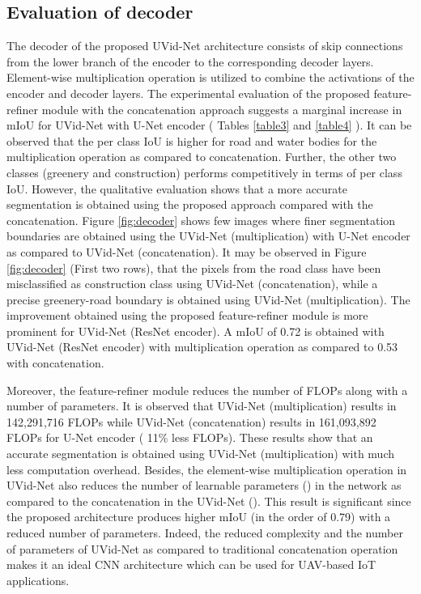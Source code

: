 \documentclass[journal]{IEEEtran}
\begin{document}
\subsection{Evaluation of decoder}
\label{Sec:Decoder}
The decoder of the proposed UVid-Net architecture consists of skip connections from the lower branch of the encoder to the corresponding decoder layers. Element-wise multiplication operation is utilized to combine the activations of the encoder and decoder layers. The experimental evaluation of the proposed feature-refiner module with the concatenation approach suggests a marginal increase in mIoU for UVid-Net with U-Net encoder ( Tables \ref{table3} and \ref{table4} ).  It can be observed that the per class IoU is higher for road and water bodies for the multiplication operation as compared to concatenation. Further, the other two classes (greenery and construction) performs competitively in terms of per class IoU. However, the qualitative evaluation shows that a more accurate segmentation is obtained using the proposed approach compared with the concatenation. Figure \ref{fig:decoder} shows few images where finer segmentation boundaries are obtained using the UVid-Net (multiplication) with U-Net encoder as compared to UVid-Net (concatenation). It may be observed in Figure \ref{fig:decoder} (First two rows), that the pixels from the road class have been misclassified as construction class using UVid-Net (concatenation), while a precise greenery-road boundary is obtained using UVid-Net (multiplication).  The improvement obtained using the proposed feature-refiner module is more prominent for UVid-Net (ResNet encoder).  A mIoU of 0.72 is obtained with UVid-Net (ResNet encoder) with multiplication operation as compared to 0.53 with concatenation. 



Moreover, the feature-refiner module reduces the number of FLOPs along with a number of parameters. It is observed that UVid-Net (multiplication) results in 142,291,716 FLOPs while UVid-Net (concatenation) results in 161,093,892 FLOPs for U-Net encoder ( 11\% less FLOPs). These results show that an accurate segmentation is obtained using UVid-Net (multiplication) with much less computation overhead. Besides, the element-wise multiplication operation in UVid-Net also reduces the number of learnable parameters  () in the network as compared to the concatenation in the UVid-Net (). This result is significant since the proposed architecture produces higher mIoU (in the order of 0.79) with a reduced number of parameters. Indeed, the reduced complexity and the number of parameters of UVid-Net as compared to traditional concatenation operation makes it an ideal CNN architecture which can be used for UAV-based IoT applications.
\end{document}
